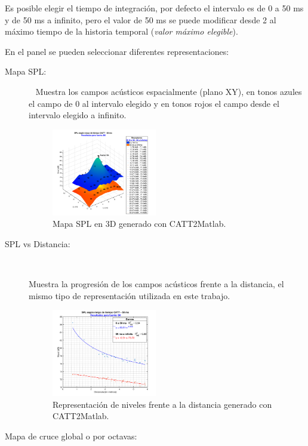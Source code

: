 Es posible elegir el tiempo de integración, por defecto el intervalo es de 0 a 50 ms y de 50 ms a infinito, pero el valor de 50 ms se puede modificar desde 2 al máximo tiempo de la historia temporal (\textit{valor máximo elegible}).
\\
\par
 En el panel se pueden seleccionar diferentes representaciones:
\begin{description}
  \item[Mapa SPL:]~
  Muestra los campos acústicos espacialmente (plano XY), en tonos azules el campo de 0 al intervalo elegido y en tonos rojos el campo desde el intervalo elegido a infinito.
  \begin{figure}[ht]
    \centering
    \includegraphics[width=0.45\textwidth]{archivos/capturas/mapaspl3d}
    \caption{Mapa SPL en 3D generado con CATT2Matlab.}
\end{figure}
\FloatBarrier

  \item[SPL vs Distancia:]~
  
  Muestra la progresión de los campos acústicos frente a la distancia, el mismo tipo de representación utilizada en este trabajo.
    \begin{figure}[ht]
    \centering
    \includegraphics[width=0.45\textwidth]{archivos/capturas/spldist}
    \caption{Representación de niveles frente a la distancia generado con CATT2Matlab.}
\end{figure}
\FloatBarrier

	\item[Mapa de cruce global o por octavas:]~
	

\end{description}
